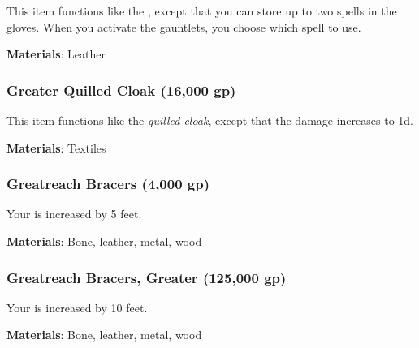 This item functions like the , except that you can store up to two spells in the gloves.
When you activate the gauntlets, you choose which spell to use.



\vspace{0.25em}
\textbf{Materials}: Leather


\lowercase{\hypertarget{item:Greater Quilled Cloak}{}}\label{item:Greater Quilled Cloak}
\hypertarget{item:Greater Quilled Cloak}{\subsubsection{Greater Quilled Cloak\hfill{} (16,000 gp)}}

This item functions like the \textit{quilled cloak}, except that the damage increases to  \plus1d.



\vspace{0.25em}
\textbf{Materials}: Textiles


\lowercase{\hypertarget{item:Greatreach Bracers}{}}\label{item:Greatreach Bracers}
\hypertarget{item:Greatreach Bracers}{\subsubsection{Greatreach Bracers\hfill{} (4,000 gp)}}

Your  is increased by 5 feet.



\vspace{0.25em}
\textbf{Materials}: Bone, leather, metal, wood


\lowercase{\hypertarget{item:Greatreach Bracers, Greater}{}}\label{item:Greatreach Bracers, Greater}
\hypertarget{item:Greatreach Bracers, Greater}{\subsubsection{Greatreach Bracers, Greater\hfill{} (125,000 gp)}}

Your  is increased by 10 feet.



\vspace{0.25em}
\textbf{Materials}: Bone, leather, metal, wood


